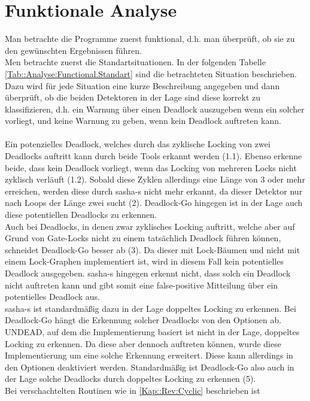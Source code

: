 \section{Funktionale Analyse}
Man betrachte die Programme zuerst funktional, d.h. man überprüft, ob sie zu den 
gewünschten Ergebnissen führen.\\
Men betrachte zuerst die Standartsituationen. In der folgenden Tabelle 
\ref{Tab::Analyse:Functional.Standart} sind die 
betrachteten Situation beschrieben. Dazu wird für jede Situation eine kurze 
Beschreibung angegeben und dann überprüft, ob die beiden Detektoren in der Lage 
sind diese korrekt zu klassifizieren, d.h. ein Warnung über einen Deadlock auszugeben
wenn ein solcher vorliegt, und keine Warnung zu geben, wenn kein Deadlock auftreten
kann.\\\\
Ein potenzielles Deadlock, welches 
durch das zyklische Locking von zwei Deadlocks auftritt kann durch beide Tools
erkannt werden (1.1). Ebenso erkenne beide, dass kein Deadlock vorliegt, wenn das 
Locking von mehreren Locks nicht zyklisch verläuft (1.2).
Sobald diese Zyklen allerdings eine Länge von 3 oder mehr 
erreichen, werden diese durch sasha-s nicht mehr erkannt, da dieser 
Detektor nur nach Loops der Länge zwei sucht (2). Deadlock-Go 
hingegen ist in der Lage auch diese potentiellen Deadlocks zu erkennen.\\
Auch bei Deadlocks, in denen zwar zyklisches Locking auftritt, welche aber 
auf Grund von Gate-Locks nicht zu einem tatsächlich Deadlock führen können,
schneidet Deadlock-Go besser ab (3). Da dieser mit Lock-Bäumen und nicht mit einem
Lock-Graphen implementiert ist, wird in diesem Fall kein potentielles Deadlock 
ausgegeben. sasha-s hingegen erkennt nicht, dass solch ein Deadlock nicht 
auftreten kann und gibt somit eine false-positive Mitteilung über ein potentielles 
Deadlock aus.\\ 
sasha-s ist standardmäßig dazu in  der Lage doppeltes Locking zu erkennen.
Bei Deadlock-Go hängt die Erkennung solcher Deadlocks von den Optionen ab.
UNDEAD, auf dem die Implementierung basiert ist nicht in der Lage, doppeltes 
Locking zu erkennen. Da diese aber dennoch auftreten können, wurde diese 
Implementierung um eine solche Erkennung erweitert. Diese kann allerdings 
in den Optionen deaktiviert werden. Standardmäßig ist Deadlock-Go also auch in 
der Lage solche Deadlocks durch doppeltes Locking zu erkennen (5). \\ 
Bei verschachtelten Routinen wie in \ref{Kap::Rev:Cyclic} beschrieben ist 
